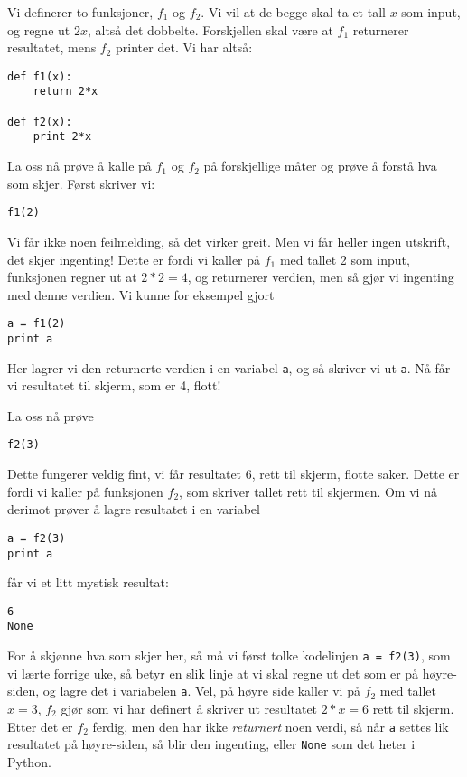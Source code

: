\documentclass[a4paper, 11pt, notitlepage]{article}
\begin{document}
Vi definerer to funksjoner, $f_1$ og $f_2$. Vi vil at de begge skal ta et tall $x$ som input, og regne ut $2x$, altså det dobbelte. Forskjellen skal være at $f_1$ returnerer resultatet, mens $f_2$ printer det. Vi har altså:
\begin{lstlisting}
def f1(x):
    return 2*x

def f2(x):
    print 2*x
\end{lstlisting}
\vspace{-0.3cm}
La oss nå prøve å kalle på $f_1$ og $f_2$ på forskjellige måter og prøve å forstå hva som skjer. Først skriver vi:
\begin{lstlisting}
f1(2)
\end{lstlisting}
\vspace{-0.3cm}
Vi får ikke noen feilmelding, så det virker greit. Men vi får heller ingen utskrift, det skjer ingenting! Dette er fordi vi kaller på $f_1$ med tallet 2 som input, funksjonen regner ut at $2*2 = 4$, og returnerer verdien, men så gjør vi ingenting med denne verdien. Vi kunne for eksempel gjort
\begin{lstlisting}
a = f1(2)
print a
\end{lstlisting}
\vspace{-0.3cm}
Her lagrer vi den returnerte verdien i en variabel \verb+a+, og så skriver vi ut \verb+a+. Nå får vi resultatet til skjerm, som er 4, flott!

La oss nå prøve
\begin{lstlisting}
f2(3)
\end{lstlisting}
\vspace{-0.3cm}
Dette fungerer veldig fint, vi får resultatet 6, rett til skjerm, flotte saker. Dette er fordi vi kaller på funksjonen $f_2$, som skriver tallet rett til skjermen. Om vi nå derimot prøver å lagre resultatet i en variabel
\begin{lstlisting}
a = f2(3)
print a
\end{lstlisting}
\vspace{-0.3cm}
får vi et litt mystisk resultat:
\begin{lstlisting}
6
None
\end{lstlisting}
\vspace{-0.3cm}
For å skjønne hva som skjer her, så må vi først tolke kodelinjen \verb+a = f2(3)+, som vi lærte forrige uke, så betyr en slik linje at vi skal regne ut det som er på høyre-siden, og lagre det i variabelen \verb+a+. Vel, på høyre side kaller vi på $f_2$ med tallet $x=3$, $f_2$ gjør som vi har definert å skriver ut resultatet $2*x=6$ rett til skjerm. Etter det er $f_2$ ferdig, men den har ikke \emph{returnert} noen verdi, så når \verb+a+ settes lik resultatet på høyre-siden, så blir den ingenting, eller \verb+None+ som det heter i Python.
\end{document}
